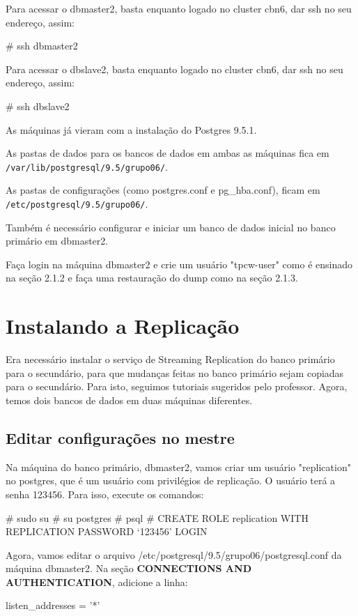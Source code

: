 \documentclass[a4paper,10pt]{article}
\begin{document}
    Para acessar o dbmaster2, basta enquanto logado no cluster cbn6, dar ssh no seu endereço, assim:
    \begin{spverbatim}
    # ssh dbmaster2
    \end{spverbatim}

    Para acessar o dbslave2, basta enquanto logado no cluster cbn6, dar ssh no seu endereço, assim:
    \begin{spverbatim}
    # ssh dbslave2
    \end{spverbatim}

    As máquinas já vieram com a instalação do Postgres 9.5.1.

    As pastas de dados para os bancos de dados em ambas as máquinas fica em \verb|/var/lib/postgresql/9.5/grupo06/|.

    As pastas de configurações (como postgres.conf e pg\_hba.conf), ficam em \verb|/etc/postgresql/9.5/grupo06/|.

    Também é necessário configurar e iniciar um banco de dados inicial no banco primário em dbmaster2.

    Faça login na máquina dbmaster2 e crie um usuário "tpcw-user" como é ensinado na seção 2.1.2 e faça uma restauração do dump como na seção 2.1.3.

\section{Instalando a Replicação}
    Era necessário instalar o serviço de Streaming Replication do banco primário para o secundário, para que mudanças feitas no banco primário sejam copiadas para o secundário. Para isto, seguimos tutoriais sugeridos pelo professor.
    Agora, temos dois bancos de dados em duas máquinas diferentes.
    \subsection{Editar configurações no mestre}
      Na máquina do banco primário, dbmaster2, vamos criar um usuário "replication" no postgres, que é um usuário com privilégios de replicação. O usuário terá a senha 123456. Para isso, execute os comandos:
      \begin{spverbatim}
      # sudo su
      # su postgres
      # psql
      # CREATE ROLE replication WITH REPLICATION PASSWORD ‘123456’ LOGIN
      \end{spverbatim}

      Agora, vamos editar o arquivo /etc/postgresql/9.5/grupo06/postgresql.conf da máquina dbmaster2.
      Na seção \textbf{CONNECTIONS AND AUTHENTICATION}, adicione a linha:
      \begin{spverbatim}
      listen_addresses = '*'
      \end{spverbatim}
\end{document}
